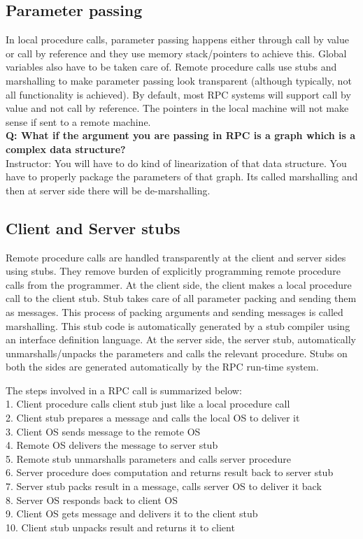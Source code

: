 \documentclass[twoside]{article}
\begin{document}
\subsection{Parameter passing}
In local procedure calls, parameter passing happens either through call by value or call by reference and they use memory stack/pointers to achieve this. Global variables also have to be taken care of. Remote procedure calls use stubs and marshalling to make parameter passing look transparent (although typically, not all functionality is achieved). By default, most RPC systems will support call by value and not call by reference. The pointers in the local machine will not make sense if sent to a remote machine.
\\\textbf{Q: What if the argument you are passing in RPC is a graph which is a complex data structure?}
\\{Instructor: You will have to do kind of linearization of that data structure. You have to properly package the parameters of that graph. Its called marshalling and then at server side there will be de-marshalling.}

\subsection{Client and Server stubs}
Remote procedure calls are handled transparently at the client and server sides using stubs. They remove burden of explicitly programming remote procedure calls from the programmer. At the client side, the client makes a local procedure call to the client stub. Stub takes care of all parameter packing and sending them as messages. This process of packing arguments and sending messages is called marshalling. This stub code is automatically generated by a stub compiler using an interface definition language. At the server side, the server stub, automatically unmarshalls/unpacks the parameters and calls the relevant procedure. Stubs on both the sides are generated automatically by the RPC run-time system.

The steps involved in a RPC call is summarized below:\\
1. Client procedure calls client stub just like a local procedure call\\
2. Client stub prepares a message and calls the local OS to deliver it\\
3. Client OS sends message to the remote OS\\
4. Remote OS delivers the message to server stub\\
5. Remote stub unmarshalls parameters and calls server procedure\\
6. Server procedure does computation and returns result back to server stub\\
7. Server stub packs result in a message, calls server OS to deliver it back\\
8. Server OS responds back to client OS\\
9. Client OS gets message and delivers it to the client stub\\
10. Client stub unpacks result and returns it to client\\
\end{document}
